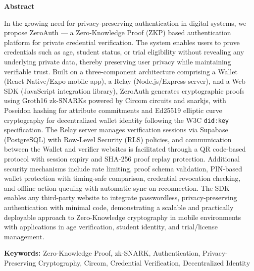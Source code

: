 \newpage
\thispagestyle{empty}
\begin{center}
{\LARGE\textbf{Abstract}}\\[1cm]
\end{center}

In the growing need for privacy-preserving authentication in digital systems, we propose ZeroAuth --- a Zero-Knowledge Proof (ZKP) based authentication platform for private credential verification. The system enables users to prove credentials such as age, student status, or trial eligibility without revealing any underlying private data, thereby preserving user privacy while maintaining verifiable trust. Built on a three-component architecture comprising a Wallet (React Native/Expo mobile app), a Relay (Node.js/Express server), and a Web SDK (JavaScript integration library), ZeroAuth generates cryptographic proofs using Groth16 zk-SNARKs powered by Circom circuits and snarkjs, with Poseidon hashing for attribute commitments and Ed25519 elliptic curve cryptography for decentralized wallet identity following the W3C \texttt{did:key} specification. The Relay server manages verification sessions via Supabase (PostgreSQL) with Row-Level Security (RLS) policies, and communication between the Wallet and verifier websites is facilitated through a QR code-based protocol with session expiry and SHA-256 proof replay protection. Additional security mechanisms include rate limiting, proof schema validation, PIN-based wallet protection with timing-safe comparison, credential revocation checking, and offline action queuing with automatic sync on reconnection. The SDK enables any third-party website to integrate passwordless, privacy-preserving authentication with minimal code, demonstrating a scalable and practically deployable approach to Zero-Knowledge cryptography in mobile environments with applications in age verification, student identity, and trial/license management.

\vspace{1cm}
\noindent\textbf{Keywords:} Zero-Knowledge Proof, zk-SNARK, Authentication, Privacy-Preserving Cryptography, Circom, Credential Verification, Decentralized Identity

